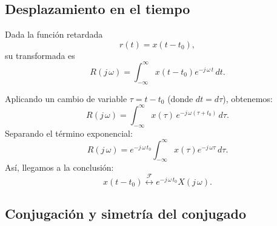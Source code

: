 \subsection{Desplazamiento en el tiempo}

Dada la función retardada
\begin{equation}
	r(t) = x(t - t_{0}) ,
\end{equation}
su transformada es
\begin{equation}
	R(j \, \omega) = \int_{-\infty}^{\infty} x(t - t_{0}) e^{-j \, \omega \, t} \, dt.
\end{equation}

Aplicando un cambio de variable $\tau = t - t_{0}$ (donde $dt = d\tau$), obtenemos:
\begin{equation}
	R(j \, \omega) = \int_{-\infty}^{\infty} x(\tau) \, e^{-j \, \omega (\tau + t_{0})} \, d\tau.
\end{equation}
Separando el término exponencial:
\begin{equation}
	R(j \, \omega) = e^{-j \, \omega \, t_{0}} \int_{-\infty}^{\infty} x(\tau) e^{-j \, \omega \tau} \, d\tau.
\end{equation}
Así, llegamos a la conclusión:
\begin{equation}
	x(t - t_{0}) \stackrel{\mathcal{F}}{\longleftrightarrow} e^{-j \, \omega \, t_{0}} X(j \, \omega) .
\end{equation}

\subsection{Conjugación y simetría del conjugado}

